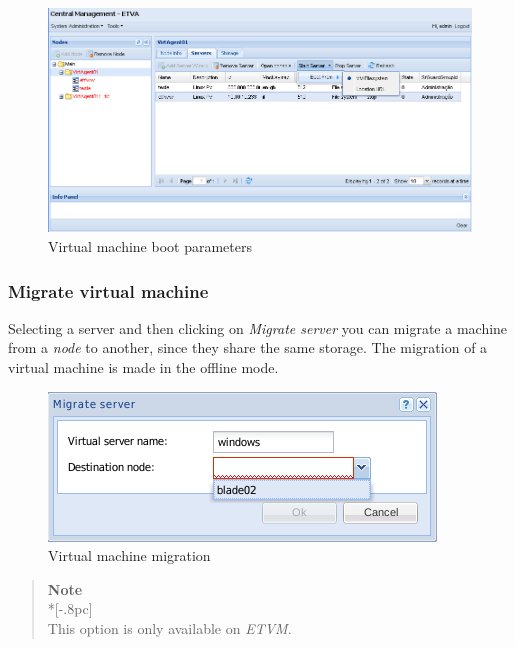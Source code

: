 \begin{figure}[H]
	\begin{center}
	\includegraphics[scale=0.45]{screenshots/server_start.png}
	\caption{Virtual machine boot parameters}
	\label{fig:server_start}
	\end{center}
\end{figure}


\subsubsection{Migrate virtual machine}
\label{sec:migrate_server}

Selecting a server and then clicking on \emph{Migrate server} you can migrate a machine from a \emph{node} to another, since they share the same storage.
The migration of a virtual machine is made in the offline mode.

\begin{figure}[H]
	\begin{center}
	\includegraphics[scale=0.5]{screenshots/server_migrate.png}
	\caption{Virtual machine migration}
	\label{fig:server_migrate}
	\end{center}
\end{figure}

\begin{quote}
	{\large \bf Note} \\*[-.8pc]
	\underline{\hspace{6in}} \\
	This option is only available on \emph{ETVM}.
\end{quote}


